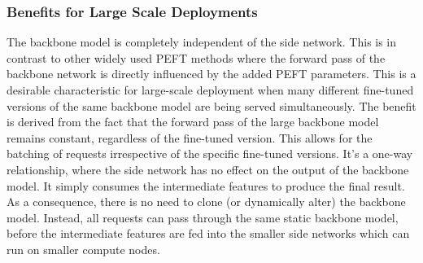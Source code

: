 \subsubsection{Benefits for Large Scale Deployments}

The backbone model is completely independent of the side network. This is in contrast to other widely used PEFT methods where the forward pass of the backbone network is directly influenced by the added PEFT parameters. This is a desirable characteristic for large-scale deployment when many different fine-tuned versions of the same backbone model are being served simultaneously. The benefit is derived from the fact that the forward pass of the large backbone model remains constant, regardless of the fine-tuned version. This allows for the batching of requests irrespective of the specific fine-tuned versions. It's a one-way relationship, where the side network has no effect on the output of the backbone model. It simply consumes the intermediate features to produce the final result. As a consequence, there is no need to clone (or dynamically alter) the backbone model. Instead, all requests can pass through the same static backbone model, before the intermediate features are fed into the smaller side networks which can run on smaller compute nodes.

